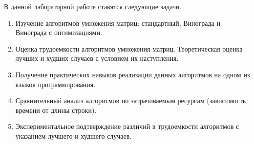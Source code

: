 \Introduction

В данной лабораторной работе ставятся следующие задачи.
\begin{enumerate}
\item Изучение алгоритмов умножения матриц: стандартный, Винограда и Винограда с оптимизациями.
\item Оценка трудоемкости алгоритмов умножения матриц. Теоретическая оценка лучших и худших случаев с условием их наступления.
\item Получение практических навыков реализации данных алгоритмов на одном из языков программирования.
\item Сравнительный анализ алгоритмов по затрачиваемым ресурсам (зависимость времени от длины строки).
\item Экспериментальное подтверждение различий в трудоемкости алгоритмов с указанием лучшего и худшего случаев.
\end{enumerate}

